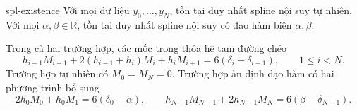 \documentclass[12pt,a4paper,oneside]{book}
\numberwithin{algorithm}{chapter}
\theoremstyle{definition}
\newcommand{\R}{\mathbb{R}}
\begin{document}
\begin{dinhly}{}{spl-existence}
Với mọi dữ liệu $y_0,\ldots,y_N$, tồn tại duy nhất spline nội suy tự nhiên. Với mọi $\alpha,\beta\in\R$, tồn tại duy nhất spline nội suy có đạo hàm biên $\alpha,\beta$.

Trong cả hai trường hợp, các mốc trong thỏa hệ tam đường chéo
\begin{equation}\label{eq:spl-interior-system}
 h_{i-1}M_{i-1}+2(h_{i-1}+h_i)M_i+h_iM_{i+1}
 =6(\delta_i-\delta_{i-1}),\qquad 1\leq i<N.
\end{equation}
Trường hợp tự nhiên có $M_0=M_N=0$. Trường hợp ấn định đạo hàm có hai phương trình bổ sung
\begin{equation}\label{eq:spl-clamped-system}
 2h_0M_0+h_0M_1=6(\delta_0-\alpha),\qquad
 h_{N-1}M_{N-1}+2h_{N-1}M_N=6(\beta-\delta_{N-1}).
\end{equation}
\end{dinhly}
\end{document}
